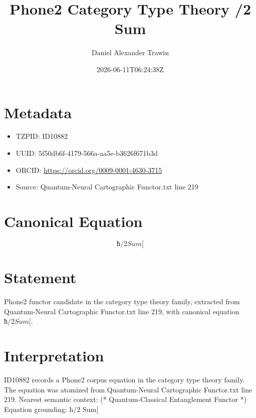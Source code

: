 \documentclass[11pt]{article}
\title{Phone2 Category Type Theory /2 Sum}
\author{Daniel Alexander Trawin}
\date{2026-06-11T06:24:38Z}
\begin{document}
\maketitle
\section*{Metadata}
\begin{itemize}
\item TZPID: ID10882
\item UUID: 5f50db6f-4179-566a-aa5e-b3626f671b3d
\item ORCID: \url{https://orcid.org/0009-0001-4630-3715}
\item Source: Quantum-Neural Cartographic Functor.txt line 219
\end{itemize}
\section*{Canonical Equation}
\[
ħ/2 Sum[
\]
\section*{Statement}
Phone2 functor candidate in the category type theory family, extracted from Quantum-Neural Cartographic Functor.txt line 219, with canonical equation $ħ/2 Sum[$.
\section*{Interpretation}
ID10882 records a Phone2 corpus equation in the category type theory family. The equation was atomized from Quantum-Neural Cartographic Functor.txt line 219. Nearest semantic context: (* Quantum-Classical Entanglement Functor *) Equation grounding: ħ/2 Sum[
\end{document}
